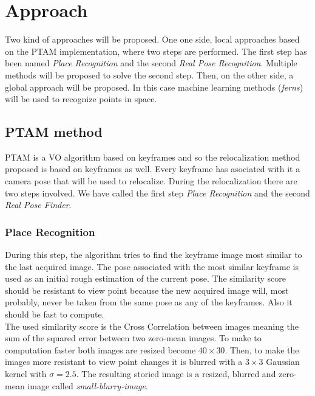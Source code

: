 \chapter{Approach}\label{sec:approach}

Two kind of approaches will be proposed. One one side, local approaches based on the PTAM implementation, where two steps are performed. The first step has been named \textit{Place Recognition} and the second \textit{Real Pose Recognition}. Multiple methods will be proposed to solve the second step. Then, on the other side, a global approach will be proposed. In this case machine learning methods (\textit{ferns}) will be used to recognize points in space.

\section{PTAM method}
\label{sec:ptam_method}

PTAM is a VO algorithm based on keyframes and so the relocalization method proposed is based on keyframes as well. Every keyframe has asociated with it a camera pose that will be used to relocalize. During the relocalization there are two steps involved. We have called the first step \textit{Place Recognition} and the second \textit{Real Pose Finder}.

\subsection{Place Recognition}
\label{ssub:place_recognition}

During this step, the algorithm tries to find the keyframe image most similar to the last acquired image. The pose associated with the most similar keyframe is used as an initial rough estimation of the current pose. The similarity score should be resistant to view point because the new acquired image will, most probably, never be taken from the same pose as any of the keyframes. Also it should be fast to compute.\\

The used similarity score is the Cross Correlation between images meaning the sum of the squared error between two zero-mean images. To make to computation faster both images are resized become $40\times30$. Then, to make the images more resistant to view point changes it is blurred with a $3\times3$ Gaussian kernel with $\sigma=2.5$. The resulting storied image is a resized, blurred and zero-mean image called \textit{small-blurry-image}.\\

